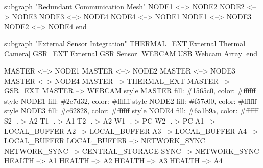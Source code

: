 \documentclass[12pt,a4paper]{report}
\begin{document}
    subgraph "Redundant Communication Mesh"
        NODE1 <--> NODE2
        NODE2 <--> NODE3
        NODE3 <--> NODE4
        NODE4 <--> NODE1
        NODE1 <--> NODE3
        NODE2 <--> NODE4
    end

    subgraph "External Sensor Integration"
        THERMAL\_EXT[External Thermal Camera]
        GSR\_EXT[External GSR Sensor]
        WEBCAM[USB Webcam Array]
    end

    MASTER <--> NODE1
    MASTER <--> NODE2
    MASTER <--> NODE3
    MASTER <--> NODE4
    MASTER --> THERMAL\_EXT
    MASTER --> GSR\_EXT
    MASTER --> WEBCAM
    style MASTER fill: \#1565c0, color: \#ffffff
    style NODE1 fill: \#2e7d32, color: \#ffffff
    style NODE2 fill: \#f57c00, color: \#ffffff
    style NODE3 fill: \#c62828, color: \#ffffff
    style NODE4 fill: \#6a1b9a, color: \#ffffff
    S2 -.-> A2
    T1 -.-> A1
    T2 -.-> A2
    W1 -.-> PC
    W2 -.-> PC
    A1 --> LOCAL\_BUFFER
    A2 --> LOCAL\_BUFFER
    A3 --> LOCAL\_BUFFER
    A4 --> LOCAL\_BUFFER
    LOCAL\_BUFFER --> NETWORK\_SYNC
    NETWORK\_SYNC --> CENTRAL\_STORAGE
    SYNC --> NETWORK\_SYNC
    HEALTH --> A1
    HEALTH --> A2
    HEALTH --> A3
    HEALTH --> A4
\end{document}
